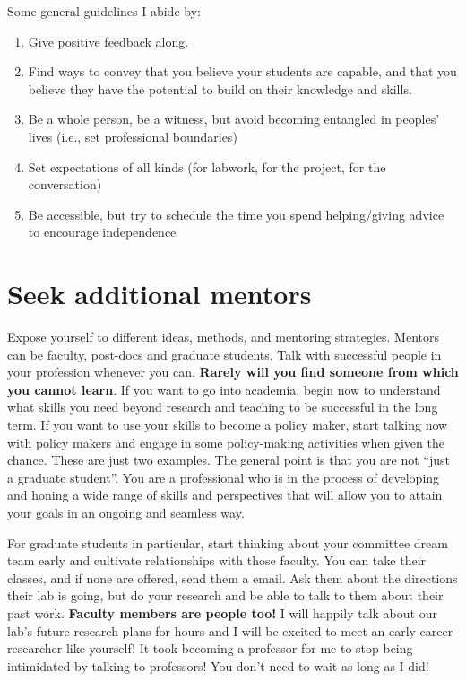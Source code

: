 \documentclass[12pt]{article}
\begin{document}
Some general guidelines I abide by:
\begin{enumerate}
\item Give positive feedback along.
\item Find ways to convey that you believe your students are capable,
  and that you believe they have the potential to build on their
  knowledge and skills.
\item Be a whole person, be a witness, but avoid becoming entangled in
  peoples' lives (i.e., set professional boundaries) 
\item Set expectations of all kinds (for labwork, for the project, for
  the conversation)
\item Be accessible, but try to schedule the time you spend
  helping/giving advice to encourage independence
\end{enumerate}

\section{Seek additional mentors}
\label{sec:mentors}
Expose yourself to different ideas, methods, and mentoring
strategies. Mentors can be faculty, post-docs and graduate
students. Talk with successful people in your profession whenever you
can. \textbf{Rarely will you find someone from which you cannot
  learn}. If you want to go into academia, begin now to understand
what skills you need beyond research and teaching to be successful in
the long term. If you want to use your skills to become a policy
maker, start talking now with policy makers and engage in some
policy-making activities when given the chance. These are just two
examples. The general point is that you are not ``just a graduate
student''. You are a professional who is in the process of developing
and honing a wide range of skills and perspectives that will allow you
to attain your goals in an ongoing and seamless way.

For graduate students in particular, start thinking about your
committee dream team early and cultivate relationships with those
faculty. You can take their classes, and if none are offered, send
them a email. Ask them about the directions their lab is going, but do
your research and be able to talk to them about their past
work. \textbf{Faculty members are people too!} I will happily talk
about our lab's future research plans for hours and I will be excited
to meet an early career researcher like yourself! It took becoming a
professor for me to stop being intimidated by talking to professors!
You don't need to wait as long as I did!
\end{document}
